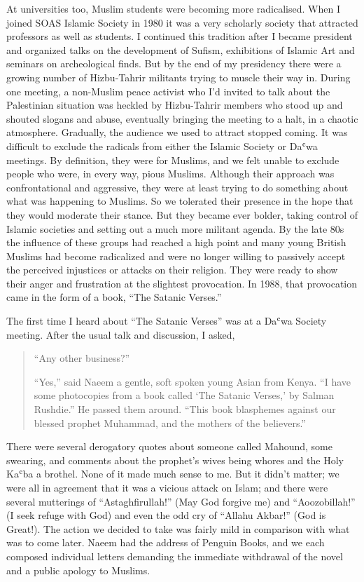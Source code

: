 \documentclass[12pt]{memoir}
\def\`{ʿ} %
\begin{document}
At universities too, Muslim students were becoming more radicalised.
When I joined SOAS Islamic Society in 1980 it was a very scholarly society
that attracted professors as well as students.
I continued this tradition after I became president
and organized talks on the development of Sufism,
exhibitions of Islamic Art and seminars on archeological finds.
But by the end of my presidency there were a growing number
of Hizbu-Tahrir militants trying to muscle their way in.
During one meeting, a non-Muslim peace activist
who I’d invited to talk about the Palestinian situation was heckled
by Hizbu-Tahrir members who stood up and shouted slogans and abuse,
eventually bringing the meeting to a halt, in a chaotic atmosphere.
Gradually, the audience we used to attract stopped coming.
It was difficult to exclude the radicals
from either the Islamic Society or Da\`wa meetings.
By definition, they were for Muslims,
and we felt unable to exclude people who were, in every way, pious Muslims.
Although their approach was confrontational and aggressive,
they were at least trying to do something about what was happening to Muslims.
So we tolerated their presence in the hope
that they would moderate their stance.
But they became ever bolder,
taking control of Islamic societies
and setting out a much more militant agenda.
By the late 80s the influence of these groups had reached a high point
and many young British Muslims had become radicalized
and were no longer willing to passively accept
the perceived injustices or attacks on their religion.
They were ready to show their anger
and frustration at the slightest provocation.
In 1988, that provocation came in the form of a book, “The Satanic Verses.”


The first time I heard about “The Satanic Verses”
was at a Da\`wa Society meeting.
After the usual talk and discussion, I asked,

\begin{quote}
“Any other business?”

“Yes,” said Naeem a gentle, soft spoken young Asian from Kenya.
“I have some photocopies from a book called ‘The Satanic Verses,’
by Salman Rushdie.”
He passed them around.
“This book blasphemes against our blessed prophet Muhammad,
and the mothers of the believers.”
\end{quote}

There were several derogatory quotes about someone called Mahound,
some swearing, and comments about the prophet’s wives
being whores and the Holy Ka\`ba a brothel.
None of it made much sense to me.
But it didn’t matter;
we were all in agreement that it was a vicious attack on Islam;
and there were several mutterings of “Astaghfirullah!”
(May God forgive me) and “Aoozobillah!” (I seek refuge with God)
and even the odd cry of “Allahu Akbar!” (God is Great!).
The action we decided to take was fairly mild
in comparison with what was to come later.
Naeem had the address of Penguin Books,
and we each composed individual letters demanding the immediate withdrawal
of the novel and a public apology to Muslims.
\end{document}
